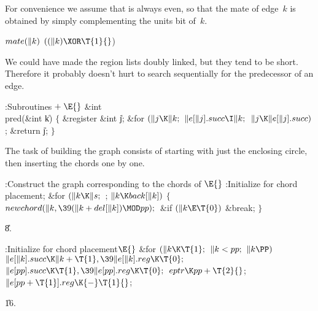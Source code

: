 For convenience we assume that  is always
even, so that the mate
of edge~$k$ is obtained by simply complementing the units bit of~$k$.

\Y\B\4\D$\\{mate}(\|k)$ \5
$((\|k)\XOR\T{1}{}$)\par
\fi

We could have made the region lists doubly linked, but
they tend to
be short. Therefore it probably doesn't hurt to search sequentially
for the predecessor of an edge.

\Y\B\4:Subroutines\X${}\mathrel+\E{}$\6
\&{int} \\{pred}(\&{int} \|k)\1\1\2\2\6
${}\{{}$\1\6
\&{register} \&{int} \|j;\7
\&{for} ${}(\|j\K\|k;{}$ ${}\|e[\|j].\\{succ}\I\|k;{}$ ${}\|j\K\|e[\|j].%
\\{succ}){}$\1\5
;\2\6
\&{return} \|j;\6
\4${}\}{}$\2\par
\fi

The task of building the graph consists of starting
with just the
enclosing circle, then inserting the chords one by one.

\Y\B\4:Construct the graph corresponding to the chords of \X${}%
\E{}$\6
:Initialize for chord placement\X;\6
\&{for} ${}(\|k\K\|s;{}$  ; ${}\|k\K\\{back}[\|k]){}$\5
${}\{{}$\1\6
${}\\{newchord}(\|k,\39(\|k+\\{del}[\|k])\MOD\\{pp});{}$\6
\&{if} ${}(\|k\E\T{0}){}$\1\5
\&{break};\2\6
\4${}\}{}$\2\par
\U8.\fi

\B{}:Initialize for chord placement\X${}\E{}$\6
\&{for} ${}(\|k\K\T{1};{}$ ${}\|k<\\{pp};{}$ ${}\|k\PP){}$\1\5
${}\|e[\|k].\\{succ}\K\|k+\T{1},\39\|e[\|k].\\{reg}\K\T{0};{}$\2\6
${}\|e[\\{pp}].\\{succ}\K\T{1},\39\|e[\\{pp}].\\{reg}\K\T{0};{}$\6
${}\\{eptr}\K\\{pp}+\T{2}{}$;\6
${}\|e[\\{pp}+\T{1}].\\{reg}\K{-}\T{1}{}$;\par
\U16.\fi

